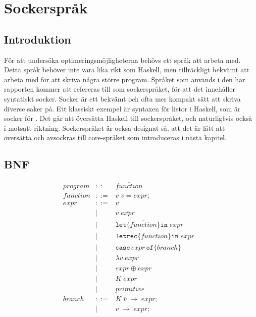 \documentclass[Rapport]{subfiles}
\begin{document}
\section{Sockerspråk}

%
%
%
%
%
%
%

%

\subsection{Introduktion}

För att undersöka optimeringsmöjligheterna behövs ett språk att arbeta med. 
Detta språk behöver inte vara lika rikt som Haskell, men tillräckligt bekvämt
att arbeta med för att skriva några större program. Språket som används i den
här rapporten kommer att refereras till som sockerspråket, för att det 
innehåller syntatiskt socker. Socker är ett bekvämt och ofta mer kompakt sätt 
att skriva diverse saker på. Ett klassiskt exempel är syntaxen
för listor i Haskell, \miniCode{[5,0,4]} som är socker för .
    Det går att översätta Haskell till sockerspråket, och naturligtvis också
i motsatt riktning. Sockerspråket är också designat så, att det är lätt att
översätta och avsockras till core-språket som introduceras i nästa kapitel. 

\subsection{BNF}
\begin{equation*}
\begin{aligned}
program &::=& \overline{function} \\
function &::=& v \; \overline{v} \mathtt{=} expr \mathtt{;} \\
expr &::=& v \\
       &|& v \; \overline{expr}  \\
       &|& \mathtt{let \{} \overline{function} \mathtt{\} in }\; expr \\
       &|& \mathtt{letrec \{} \overline{function} \mathtt{\} in} \; expr \\
       &|& \mathtt{case}\,expr\,\mathtt{of \{} \overline{branch} \mathtt{\}} \\
       &|& \mathtt{\lambda } v \mathtt{.} expr \\
       &|& expr \oplus expr \\
       &|& K \; \overline{expr} \\
       &|& primitive \\
branch &::=& K \; \overline{v} \; \mathtt{\rightarrow} \; expr \mathtt{;} \\
         &|& v \; \mathtt{\rightarrow} \; expr \mathtt{;}
\end{aligned}
\end{equation*}
\end{document}

